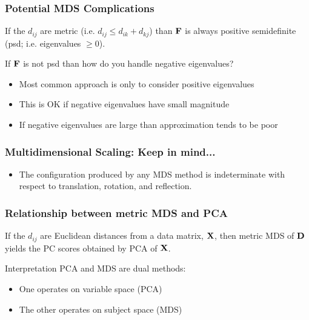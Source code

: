 \documentclass{beamer}
\begin{document}
\begin{frame}
  \frametitle{Potential MDS Complications}

If the $d_{ij}$ are metric (i.e. $d_{ij} \leq d_{ik} + d_{kj}$) than $\mathbf{F}$ is always positive semidefinite (psd; i.e. eigenvalues $\geq 0$).

\medskip
If $\mathbf{F}$ is not psd than how do you handle negative eigenvalues?

\begin{itemize}

\item Most common approach is only to consider positive eigenvalues
\item This is OK if negative eigenvalues have small magnitude
\item If negative eigenvalues are large than approximation tends to be poor

\end{itemize}


\end{frame}

\begin{frame}
  \frametitle{Multidimensional Scaling: Keep in mind...}

\begin{itemize}
\item The configuration produced by any MDS method is indeterminate with respect to translation, rotation, and reflection.

\end{itemize}


\end{frame}

\begin{frame}
  \frametitle{Relationship between metric MDS and PCA}

 If the $d_{ij}$ are Euclidean distances from a data matrix, $\mathbf{X}$, then metric MDS of $\mathbf{D}$ yields the PC scores obtained by PCA of $\mathbf{X}$.

 \medskip
  \begin{block}{Interpretation}
PCA and MDS are dual methods:
\begin{itemize}
  \item One operates on variable space (PCA)
  \item The other operates on subject space (MDS)
\end{itemize}
\end{block}

\end{frame}
\end{document}
